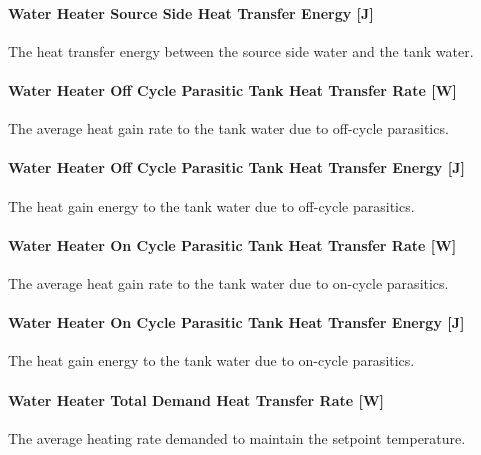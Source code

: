 \paragraph{Water Heater Source Side Heat Transfer Energy {[}J{]}}\label{water-heater-source-side-heat-transfer-energy-j}

The heat transfer energy between the source side water and the tank water.

\paragraph{Water Heater Off Cycle Parasitic Tank Heat Transfer Rate {[}W{]}}\label{water-heater-off-cycle-parasitic-tank-heat-transfer-rate-w}

The average heat gain rate to the tank water due to off-cycle parasitics.

\paragraph{Water Heater Off Cycle Parasitic Tank Heat Transfer Energy {[}J{]}}\label{water-heater-off-cycle-parasitic-tank-heat-transfer-energy-j}

The heat gain energy to the tank water due to off-cycle parasitics.

\paragraph{Water Heater On Cycle Parasitic Tank Heat Transfer Rate {[}W{]}}\label{water-heater-on-cycle-parasitic-tank-heat-transfer-rate-w}

The average heat gain rate to the tank water due to on-cycle parasitics.

\paragraph{Water Heater On Cycle Parasitic Tank Heat Transfer Energy {[}J{]}}\label{water-heater-on-cycle-parasitic-tank-heat-transfer-energy-j}

The heat gain energy to the tank water due to on-cycle parasitics.

\paragraph{Water Heater Total Demand Heat Transfer Rate {[}W{]}}\label{water-heater-total-demand-heat-transfer-rate-w}

The average heating rate demanded to maintain the setpoint temperature.

